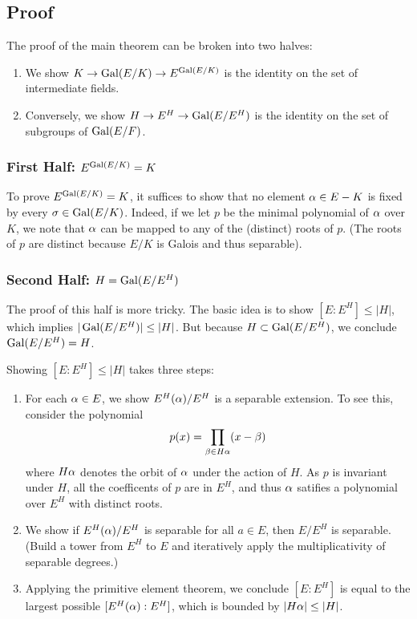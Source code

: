 \subsection{Proof}
The proof of the main theorem can be broken into two halves:
\begin{enumerate}
    \item We show $K \rightarrow \operatorname{Gal}(E/K) \rightarrow E^{\operatorname{Gal}(E/K)}$ is the identity on the set of intermediate fields.
    \item Conversely, we show $H \rightarrow E^H \rightarrow \operatorname{Gal}(E/E^H)$ is the identity on the set of subgroups of $\operatorname{Gal}(E/F)$.
\end{enumerate}

\subsubsection{First Half: $E^{\operatorname{Gal}(E/K)} = K$}
To prove $E^{\operatorname{Gal}(E/K)} = K$, it suffices to show that no element $\alpha \in E-K$ is fixed by every $\sigma \in \operatorname{Gal}(E/K)$. Indeed, if we let $p$ be the minimal polynomial of $\alpha$ over $K$, we note that $\alpha$ can be mapped to any of the (distinct) roots of $p$. (The roots of $p$ are distinct because $E/K$ is Galois and thus separable).

\subsubsection{Second Half: $H = \operatorname{Gal}(E/E^H)$}
The proof of this half is more tricky. The basic idea is to show $[E : E^H] \leq |H|$, which implies $|\operatorname{Gal}(E/E^H)| \leq |H|$. But because $H \subset \operatorname{Gal}(E/E^H)$, we conclude $\operatorname{Gal}(E/E^H) = H$.

Showing $[E : E^H] \leq |H|$ takes three steps:
\begin{enumerate}
    \item For each $\alpha \in E$, we show $E^H(\alpha)/E^H$ is a separable extension. To see this, consider the polynomial
        \[
            p(x) = \prod_{\beta \in H\alpha} (x - \beta)
        \]
        where $H\alpha$ denotes the orbit of $\alpha$ under the action of $H$. As $p$ is invariant under $H$, all the coefficents of $p$ are in $E^H$, and thus $\alpha$ satifies a polynomial over $E^H$ with distinct roots.
    \item We show if $E^H(\alpha)/E^H$ is separable for all $a \in E$, then $E/E^H$ is separable. (Build a tower from $E^H$ to $E$ and iteratively apply the multiplicativity of separable degrees.)
    \item Applying the primitive element theorem, we conclude $[E : E^H]$ is equal to the largest possible $[E^H(\alpha): E^H]$, which is bounded by $|H\alpha| \leq |H|$.
\end{enumerate}

